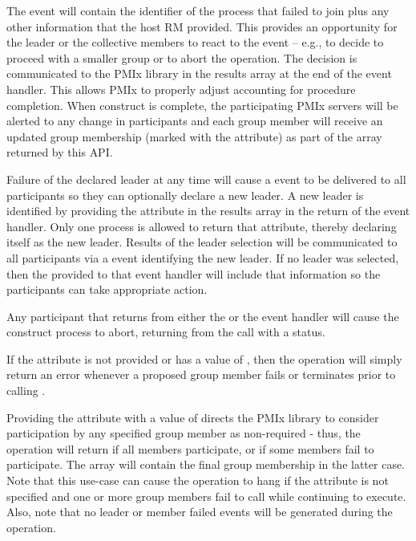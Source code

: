 The event will contain the identifier of the process that failed to join plus any other information that the host \ac{RM} provided. This provides an opportunity for the leader or the collective members to react to the event – e.g., to decide to proceed with a smaller group or to abort the operation. The decision is communicated to the \ac{PMIx} library in the results array at the end of the event handler. This allows \ac{PMIx} to properly adjust accounting for procedure completion. When construct is complete, the participating \ac{PMIx} servers will be alerted to any change in participants and each group member will receive an updated group membership (marked with the  attribute) as part of the  array returned by this \ac{API}.

Failure of the declared leader at any time will cause a  event to be delivered to all participants so they can optionally declare a new leader. A new leader is identified by providing the  attribute in the results array in the return of the event handler. Only one process is allowed to return that attribute, thereby declaring itself as the new leader. Results of the leader selection will be communicated to all participants via a  event identifying the new leader. If no leader was selected, then the  provided to that event handler will include that information so the participants can take appropriate action.

Any participant that returns  from either the  or the  event handler will cause the construct process to abort, returning from the call with a  status.

If the  attribute is not provided or has a value of , then the  operation will simply return an error whenever a proposed group member fails or terminates prior to calling .

Providing the  attribute with a value of  directs the \ac{PMIx} library to consider participation by any specified group member as non-required - thus, the operation will return  if all members participate, or  if some members fail to participate. The  array will contain the final group membership in the latter case. Note that this use-case can cause the operation to hang if the  attribute is not specified and one or more group members fail to call  while continuing to execute. Also, note that no leader or member failed events will be generated during the operation.

